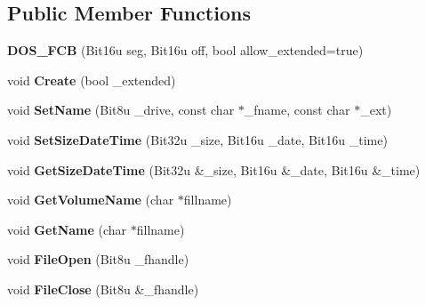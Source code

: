 \subsection*{Public Member Functions}
\begin{DoxyCompactItemize}
\item 
\hypertarget{classDOS__FCB_ab319f54fa348ba7ec8ec31f0be35ffd7}{{\bfseries D\-O\-S\-\_\-\-F\-C\-B} (Bit16u seg, Bit16u off, bool allow\-\_\-extended=true)}\label{classDOS__FCB_ab319f54fa348ba7ec8ec31f0be35ffd7}

\item 
\hypertarget{classDOS__FCB_af0cb47f3b62e13768e6e60f54da03cb4}{void {\bfseries Create} (bool \-\_\-extended)}\label{classDOS__FCB_af0cb47f3b62e13768e6e60f54da03cb4}

\item 
\hypertarget{classDOS__FCB_a1aa645dffc5faca4b992dfd1b6530ad8}{void {\bfseries Set\-Name} (Bit8u \-\_\-drive, const char $\ast$\-\_\-fname, const char $\ast$\-\_\-ext)}\label{classDOS__FCB_a1aa645dffc5faca4b992dfd1b6530ad8}

\item 
\hypertarget{classDOS__FCB_ac918ad0a449940524b2f81a56157a957}{void {\bfseries Set\-Size\-Date\-Time} (Bit32u \-\_\-size, Bit16u \-\_\-date, Bit16u \-\_\-time)}\label{classDOS__FCB_ac918ad0a449940524b2f81a56157a957}

\item 
\hypertarget{classDOS__FCB_a34bd6b8d681c90c1839edf5e11a45c5a}{void {\bfseries Get\-Size\-Date\-Time} (Bit32u \&\-\_\-size, Bit16u \&\-\_\-date, Bit16u \&\-\_\-time)}\label{classDOS__FCB_a34bd6b8d681c90c1839edf5e11a45c5a}

\item 
\hypertarget{classDOS__FCB_ad24635eedd0d40ea0b3307130164efa5}{void {\bfseries Get\-Volume\-Name} (char $\ast$fillname)}\label{classDOS__FCB_ad24635eedd0d40ea0b3307130164efa5}

\item 
\hypertarget{classDOS__FCB_ae0acbf219f3acd38ea345a9bd7d3d1d7}{void {\bfseries Get\-Name} (char $\ast$fillname)}\label{classDOS__FCB_ae0acbf219f3acd38ea345a9bd7d3d1d7}

\item 
\hypertarget{classDOS__FCB_a891b22e2889cdb34a3d1c9410328d17e}{void {\bfseries File\-Open} (Bit8u \-\_\-fhandle)}\label{classDOS__FCB_a891b22e2889cdb34a3d1c9410328d17e}

\item 
\hypertarget{classDOS__FCB_a538abc0ea3fee9715173dd1bc1d8951a}{void {\bfseries File\-Close} (Bit8u \&\-\_\-fhandle)}\label{classDOS__FCB_a538abc0ea3fee9715173dd1bc1d8951a}


\end{DoxyCompactItemize}
